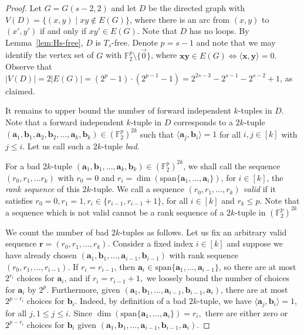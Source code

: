 \documentclass{article}
\theoremstyle{plain}
\theoremstyle{definition}
\newcommand{\ba}{\mathbf{a}}
\newcommand{\bb}{\mathbf{b}}
\newcommand{\br}{\mathbf{r}}
\newcommand{\bx}{\mathbf{x}}
\newcommand{\by}{\mathbf{y}}
\begin{document}
\begin{proof}
    Let $G = G(s-2, 2)$ and let $D$ be the directed graph with $V(D) = \{ (x, y) \mid xy \not\in E(G) \}$, where there is an arc from $(x, y)$ to $(x', y')$ if and only if $xy' \in E(G)$. Note that $D$ has no loops. By Lemma~\ref{lem:Hs-free}, $D$ is $T_s$-free. Denote $p = s-1$ and note that we may identify the vertex set of $G$ with $\mathbb{F}_2^p \setminus \{ \overrightarrow{0} \}$, where $\bx \by \in E(G) \iff \langle \bx, \by \rangle = 0.$ Observe that $|V(D)| = 2 |E(G)| = (2^p - 1) \cdot (2^{p-1} - 1) = 2^{2s-3} - 2^{s-1} - 2^{s-2} + 1$, as claimed.
    
    It remains to upper bound the number of forward independent $k$-tuples in $D$. Note that a forward independent $k$-tuple in $D$ corresponds to a $2k$-tuple $(\ba_1, \bb_1, \ba_2, \bb_2, \dots, \ba_k, \bb_k) \in (\mathbb{F}_2^p)^{2k}$ such that $\langle \ba_j, \bb_i \rangle = 1$ for all $i,j \in [k]$ with $j \le i.$ Let us call such a $2k$-tuple \emph{bad}.

    For a bad $2k$-tuple $(\ba_1, \bb_1, \dots, \ba_k, \bb_k) \in (\mathbb{F}_2^p)^{2k}$, we shall call the sequence $(r_0, r_1, \dots r_k)$ with $r_0 = 0$ and $r_i = \dim( \mathrm{span} \{ \ba_1, \dots, \ba_i \})$, for $i \in [k]$, the \emph{rank sequence} of this $2k$-tuple. We call a sequence $(r_0, r_1, \dots, r_k)$ \emph{valid} if it satisfies $r_0 = 0, r_1 = 1, r_i \in \{r_{i-1}, r_{i-1} + 1\}$, for all $i \in [k]$ and $r_k \le p$. Note that a sequence which is not valid cannot be a rank sequence of a $2k$-tuple in $(\mathbb{F}_2^p)^{2k}$
    
    We count the number of bad $2k$-tuples as follows. Let us fix an arbitrary valid sequence $\br = (r_0, r_1, \dots, r_k)$. Consider a fixed index $i \in [k]$ and suppose we have already chosen $(\ba_1, \bb_1, \dots, \ba_{i-1}, \bb_{i-1})$ with rank sequence $(r_0, r_1, \dots, r_{i-1})$. If $r_i = r_{i-1}$, then $\ba_i \in \mathrm{span} \{ \ba_1, \dots, \ba_{i-1} \}$, so there are at most $2^{r_i}$ choices for $\ba_i$, and if $r_i = r_{i-1} + 1,$ we loosely bound the number of choices for $\ba_i$ by $2^p$. Furthermore, given $(\ba_1, \bb_1, \dots, \ba_{i-1}, \bb_{i-1}, \ba_i)$, there are at most $2^{p - r_i}$ choices for $\bb_i$. Indeed, by definition of a bad $2k$-tuple, we have $\langle \ba_j, \bb_i \rangle = 1$, for all $j, 1 \le j\le i$. Since $\dim (\mathrm{span} \{\ba_1, \dots, \ba_i \}) = r_i,$ there are either zero or $2^{p - r_i}$ choices for $\bb_i$ given $(\ba_1, \bb_1, \dots, \ba_{i-1}, \bb_{i-1}, \ba_i)$.


\end{proof}
\end{document}
